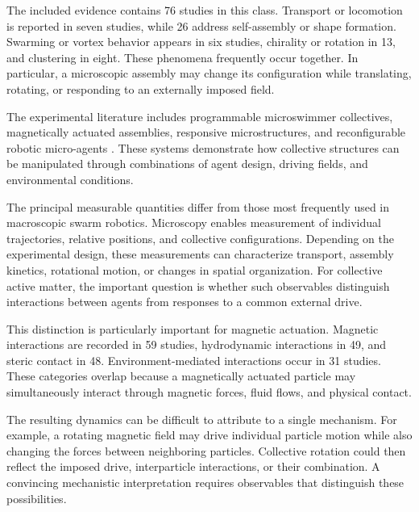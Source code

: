 The included evidence contains 76 studies in this class.
Transport or locomotion is reported in seven studies, while
26 address self-assembly or shape formation. Swarming or
vortex behavior appears in six studies, chirality or rotation
in 13, and clustering in eight. These phenomena frequently
occur together. In particular, a microscopic assembly may
change its configuration while translating, rotating, or
responding to an externally imposed field.

The experimental literature includes programmable
microswimmer collectives, magnetically actuated assemblies,
responsive microstructures, and reconfigurable robotic
micro-agents
\cite{Sun2021swarmingmicrodrople,Xie2020bioinspiredsoftmic,Pauer2021programmabledesign,MayorgaMartinez2023multimodaldrivenma,Yigit2019programmablecollect,Das2023optoelectronictraje,Rivas2023spatialpatterningo,McGovern2024multifunctionalchir,Feng2023weakionexchangeba,Sun2024multiplemagnetoopt,Cheng2025selfassemblyandco,Je2024spatiallyselective,Cao2024mofbasedmagneticm,Li2023swarmingresponsive,Liu2022bionicmorphological}.
These systems demonstrate how collective structures can
be manipulated through combinations of agent design,
driving fields, and environmental conditions.

The principal measurable quantities differ from those
most frequently used in macroscopic swarm robotics.
Microscopy enables measurement of individual trajectories,
relative positions, and collective configurations.
Depending on the experimental design, these measurements
can characterize transport, assembly kinetics,
rotational motion, or changes in spatial organization.
For collective active matter, the important question
is whether such observables distinguish interactions
between agents from responses to a common external drive.

This distinction is particularly important for
magnetic actuation. Magnetic interactions are recorded
in 59 studies, hydrodynamic interactions in 49,
and steric contact in 48. Environment-mediated
interactions occur in 31 studies. These categories
overlap because a magnetically actuated particle
may simultaneously interact through magnetic forces,
fluid flows, and physical contact.

The resulting dynamics can be difficult to attribute
to a single mechanism. For example, a rotating
magnetic field may drive individual particle motion
while also changing the forces between neighboring
particles. Collective rotation could then reflect
the imposed drive, interparticle interactions,
or their combination. A convincing mechanistic
interpretation requires observables that distinguish
these possibilities.

